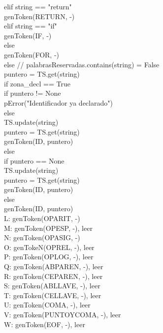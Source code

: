 \documentclass[11pt, , a4paper, titlepage]{article}
\begin{document}
\begin{flushleft}
    \qquad    elif string == "\phantom{}return"\\
    \qquad \quad       genToken(RETURN, -)\\
    \qquad     elif string == "\phantom{}if"\\
    \qquad \quad       genToken(IF, -)\\
    \qquad     else\\
    \qquad \quad      genToken(FOR, -)\\
    \clearpage
    \quad       else \hspace{5mm} // palabrasReservadas.contains(string) = False\\
    \qquad          puntero = TS.get(string)\\
    \qquad          if zona\_decl == True\\
    \qquad \quad        if puntero != None\\
    \qquad \quad \quad      pError("\phantom{}Identificador ya declarado")\\
    \qquad \quad        else\\
    \qquad \quad \quad      TS.update({string})\\
    \qquad \quad \quad      puntero = TS.get(string)\\
    \qquad \quad \quad      genToken(ID, puntero)\\
    \qquad          else\\
    \qquad \quad        if puntero == None\\
    \qquad \quad \quad      TS.update({string})\\
    \qquad \quad \quad      puntero = TS.get(string)\\
    \qquad \quad \quad      genToken(ID, puntero)\\
    \qquad \quad        else\\
    \qquad \quad \quad      genToken(ID, puntero)\\
    \vspace{\baselineskip}
    L: genToken(OPARIT, -)\\
    M: genToken(OPESP, -), leer\\
    N: genToken(OPASIG, -)\\
    O: genTokeN(OPREL, -), leer\\
    P: genToken(OPLOG, -), leer\\
    Q: genToken(ABPAREN, -), leer\\
    R: genToken(CEPAREN, -), leer\\
    S: genToken(ABLLAVE, -), leer\\
    T: genToken(CELLAVE, -), leer\\
    U: genToken(COMA, -), leer\\
    V: genToken(PUNTOYCOMA, -), leer\\
    W: genToken(EOF, -), leer\\
\end{flushleft}
\end{document}
